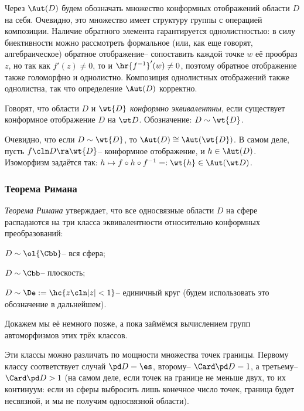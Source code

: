 \documentclass[a4paper]{article}
\begin{document}
Через $\Aut(D)$ будем обозначать множество конформных отображений области $D$ на себя.
Очевидно, это множество имеет структуру группы с операцией композиции.
Наличие обратного элемента гарантируется однолистностью: в силу биективности можно рассмотреть
формальное (или, как еще говорят, алгебраическое) обратное отображение-- сопоставить каждой точке
$w$ её прообраз $z$, но так как $f'(z)\neq 0$, то и $\hr{f^{-1}}'(w) \neq 0$, поэтому обратное отображение
также голоморфно и однолистно. Композиция однолистных отображений также однолистна, так что определение $\Aut(D)$
корректно.

\begin{df}
Говорят, что области $D$ и $\wt{D}$ \emph{конформно эквивалентны}, если существует конформное
отображение $D$ на $\wt D$. Обозначение: $D \sim \wt{D}$.
\end{df}

Очевидно, что если $D \sim \wt{D}$, то $\Aut(D) \cong \Aut(\wt{D})$. В самом деле, пусть $f\cln D\ra \wt{D}$-- конформное
отображение, и $h \in \Aut(D)$. Изоморфизм задаётся так: $h \mapsto f \circ h \circ f^{-1} = :\wt{h} \in \Aut(\wt D)$.

\subsubsection{Теорема Римана}

\emph{Теорема Римана} утверждает, что все односвязные области $D$ на сфере распадаются на три класса эквивалентности
относительно конформных преобразований:

\begin{items}{-2}
\item $D \sim \ol{\Cbb}$-- вся сфера;
\item $D \sim \Cbb$-- плоскость;
\item $D \sim \De := \hc{z\cln |z|<1}$-- единичный круг (будем использовать это обозначение в дальнейшем).
\end{items}

Докажем мы её немного позже, а пока займёмся вычислением групп автоморфизмов этих трёх классов.

Эти классы можно различать по мощности множества точек границы. Первому классу соответствует случай $\pd D = \es$,
второму-- $\Card \pd D = 1$, а третьему-- $\Card \pd D > 1$ (на самом деле, если точек на границе не меньше двух,
то их континуум: если из сферы выбросить лишь конечное число точек, граница  будет несвязной, и мы не получим
односвязной области).
\end{document}
